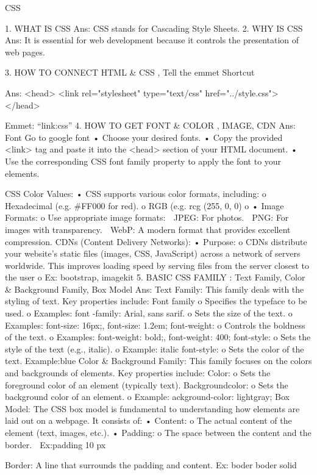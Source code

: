 CSS

1.	WHAT IS CSS
Ans: CSS stands for Cascading Style Sheets.
2.	WHY IS CSS
 Ans: It is essential for web development because it controls the presentation of web pages.

3.	HOW TO CONNECT HTML & CSS , Tell the emmet Shortcut

Ans:
 <head>
  <link rel="stylesheet" type="text/css" href="../style.css">
</head>

Emmet: “link:css”
4.	HOW TO GET FONT & COLOR , IMAGE, CDN
Ans:
 Font  
Go to google font
•  Choose your desired fonts. 
•  Copy the provided <link> tag and paste it into the <head> section of your HTML document. 
•  Use the corresponding CSS font family property to apply the font to your elements.

CSS Color Values: 
•	CSS supports various color formats, including: 
o	Hexadecimal (e.g. #FF000 for red).
o	RGB (e.g. rcg (255, 0, 0)
o	
•	Image Formats: 
o	Use appropriate image formats: 
	JPEG: For photos.   
	PNG: For images with transparency.   
	WebP: A modern format that provides excellent compression.
CDNs (Content Delivery Networks):
•	Purpose: 
o	CDNs distribute your website's static files (images, CSS, JavaScript) across a network of servers worldwide. This improves loading speed by serving files from the server closest to the user
o	Ex: bootstrap, imagekit
5.	BASIC CSS FAMILY : Text Family, Color & Background Family, Box Model
Ans: 
Text Family:
This family deals with the styling of text. Key properties include:
Font family
o	Specifies the typeface to be used.
o	Examples: font -family: Arial, sans sarif.
o	Sets the size of the text.
o	Examples: font-size: 16px;, font-size: 1.2em;
	font-weight:
o	Controls the boldness of the text.
o	Examples: font-weight: bold;, font-weight: 400;
font-style:
o	Sets the style of the text (e.g., italic).
o	Example: italic
font-style:
o	Sets the color of the text.
Example:blue
Color & Background Family:
This family focuses on the colors and backgrounds of elements. Key properties include:
Color:
o	Sets the foreground color of an element (typically text).
Backgroundcolor:
o	Sets the background color of an element.
o	Example: ackground-color: lightgray;
Box Model:
The CSS box model is fundamental to understanding how elements are laid out on a webpage. It consists of:
•	Content: 
o	The actual content of the element (text, images, etc.).
•	Padding: 
o	The space between the content and the border.
	Ex:padding 10 px

Border: 
A line that surrounds the padding and content.
                  Ex: boder boder solid

